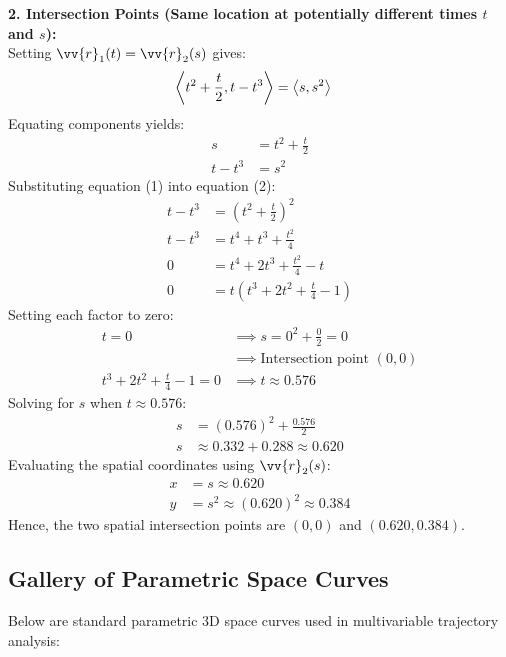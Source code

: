 \begin{sol}
\textbf{2. Intersection Points (Same location at potentially different times $t$ and $s$):} \\
Setting $\vv{r}_1(t) = \vv{r}_2(s)$ gives:
\begin{align*}
\left\langle t^2 + \frac{t}{2}, t - t^3 \right\rangle &= \left\langle s, s^2 \right\rangle
\end{align*}
Equating components yields:
\begin{align*}
s &= t^2 + \frac{t}{2} \tag{1} \\
t - t^3 &= s^2 \tag{2}
\end{align*}
Substituting equation (1) into equation (2):
\begin{align*}
t - t^3 &= \left(t^2 + \frac{t}{2}\right)^2 \\
t - t^3 &= t^4 + t^3 + \frac{t^2}{4} \\
0 &= t^4 + 2t^3 + \frac{t^2}{4} - t \\
0 &= t\left(t^3 + 2t^2 + \frac{t}{4} - 1\right)
\end{align*}
Setting each factor to zero:
\begin{align*}
t = 0 & \implies s = 0^2 + \frac{0}{2} = 0 \\
&\implies \text{Intersection point } (0, 0) \\
t^3 + 2t^2 + \frac{t}{4} - 1 = 0 & \implies t \approx 0.576
\end{align*}
Solving for $s$ when $t \approx 0.576$:
\begin{align*}
s &= (0.576)^2 + \frac{0.576}{2} \\
s &\approx 0.332 + 0.288 \approx 0.620
\end{align*}
Evaluating the spatial coordinates using $\vv{r}_2(s)$:
\begin{align*}
x &= s \approx 0.620 \\
y &= s^2 \approx (0.620)^2 \approx 0.384
\end{align*}
Hence, the two spatial intersection points are $(0, 0)$ and $(0.620, 0.384)$.
\end{sol}

\subsection{Gallery of Parametric Space Curves}

Below are standard parametric 3D space curves used in multivariable trajectory analysis:

